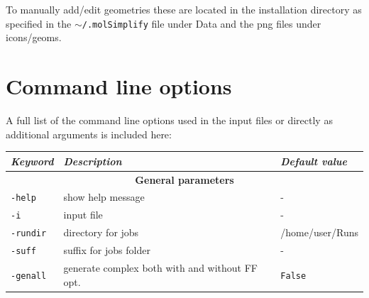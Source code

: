 \documentclass[a4paper,12pt]{assignment}
\begin{document}
To manually add/edit geometries these are located in the installation directory as specified in the \texttt{$\sim$/.molSimplify} file under Data and the png files under icons/geoms.

\section{Command line options}

A full list of the command line options used in the input files or directly as additional arguments is included here: \\


\centering
\small
\begin{tabular}{|l|l|l|}
\hline
\textit{\textbf{Keyword}} & \textit{\textbf{Description}} & \textit{\textbf{Default value}} \\
\hline
\multicolumn{3}{|c|}{\Large \textbf{General parameters}}\\ \hline
\texttt{-help} & show help message & - \\
\texttt{-i} & input file & - \\
\texttt{-rundir} & directory for jobs & /home/user/Runs \\
\texttt{-suff} & suffix for jobs folder & - \\
\texttt{-genall} & generate complex both with and without FF opt. & \texttt{False} \\
\hline
\end{tabular}
\end{document}
